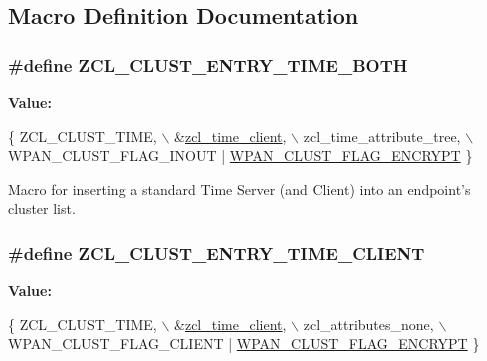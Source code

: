 \subsection{Macro Definition Documentation}
\hypertarget{group__zcl__time_gaa45500dbe82c2beea426914014e26fff}{
\subsubsection[{Z\-C\-L\-\_\-\-C\-L\-U\-S\-T\-\_\-\-E\-N\-T\-R\-Y\-\_\-\-T\-I\-M\-E\-\_\-\-B\-O\-T\-H}]{\setlength{\rightskip}{0pt plus 5cm}\#define Z\-C\-L\-\_\-\-C\-L\-U\-S\-T\-\_\-\-E\-N\-T\-R\-Y\-\_\-\-T\-I\-M\-E\-\_\-\-B\-O\-T\-H}}\label{group__zcl__time_gaa45500dbe82c2beea426914014e26fff}
{\bfseries Value\-:}
\begin{DoxyCode}
\{ ZCL\_CLUST\_TIME,                \(\backslash\)
         &\hyperlink{group__zcl__time_ga2c66ee215547beae5b5dde4f23cc8e00}{zcl\_time\_client},             \(\backslash\)
         zcl\_time\_attribute\_tree,      \(\backslash\)
         WPAN\_CLUST\_FLAG\_INOUT | \hyperlink{group__wpan__aps_ga1eafd87038a2134da7a1f72e6801d23b}{WPAN\_CLUST\_FLAG\_ENCRYPT}
       \}
\end{DoxyCode}


Macro for inserting a standard Time Server (and Client) into an endpoint's cluster list. 

\hypertarget{group__zcl__time_gac043586e4bfcfa93f631aa144158a17c}{
\subsubsection[{Z\-C\-L\-\_\-\-C\-L\-U\-S\-T\-\_\-\-E\-N\-T\-R\-Y\-\_\-\-T\-I\-M\-E\-\_\-\-C\-L\-I\-E\-N\-T}]{\setlength{\rightskip}{0pt plus 5cm}\#define Z\-C\-L\-\_\-\-C\-L\-U\-S\-T\-\_\-\-E\-N\-T\-R\-Y\-\_\-\-T\-I\-M\-E\-\_\-\-C\-L\-I\-E\-N\-T}}\label{group__zcl__time_gac043586e4bfcfa93f631aa144158a17c}
{\bfseries Value\-:}
\begin{DoxyCode}
\{ ZCL\_CLUST\_TIME,                \(\backslash\)
         &\hyperlink{group__zcl__time_ga2c66ee215547beae5b5dde4f23cc8e00}{zcl\_time\_client},             \(\backslash\)
         zcl\_attributes\_none,          \(\backslash\)
         WPAN\_CLUST\_FLAG\_CLIENT | \hyperlink{group__wpan__aps_ga1eafd87038a2134da7a1f72e6801d23b}{WPAN\_CLUST\_FLAG\_ENCRYPT}
       \}
\end{DoxyCode}



